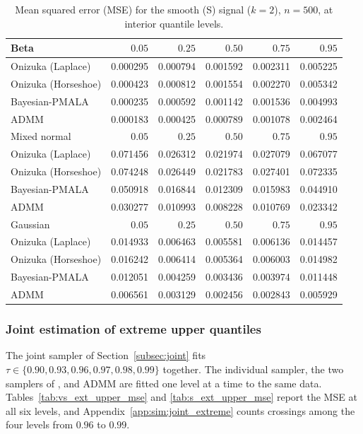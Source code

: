 \begin{table}[!htbp]
\centering
\small
\caption{Mean squared error (MSE) for the smooth (S) signal ($k=2$), $n=500$, at interior quantile levels.}
\label{tab:s_int_mse}
\begin{tabular}{lrrrrr}
\toprule
Beta & $0.05$ & $0.25$ & $0.50$ & $0.75$ & $0.95$ \\
\midrule
Onizuka (Laplace) & 0.000295 & 0.000794 & 0.001592 & 0.002311 & 0.005225 \\
Onizuka (Horseshoe) & 0.000423 & 0.000812 & 0.001554 & 0.002270 & 0.005342 \\
Bayesian-PMALA & 0.000235 & 0.000592 & 0.001142 & 0.001536 & 0.004993 \\
ADMM & 0.000183 & 0.000425 & 0.000789 & 0.001078 & 0.002464 \\
\midrule
Mixed normal & $0.05$ & $0.25$ & $0.50$ & $0.75$ & $0.95$ \\
\midrule
Onizuka (Laplace) & 0.071456 & 0.026312 & 0.021974 & 0.027079 & 0.067077 \\
Onizuka (Horseshoe) & 0.074248 & 0.026449 & 0.021783 & 0.027401 & 0.072335 \\
Bayesian-PMALA & 0.050918 & 0.016844 & 0.012309 & 0.015983 & 0.044910 \\
ADMM & 0.030277 & 0.010993 & 0.008228 & 0.010769 & 0.023342 \\
\midrule
Gaussian & $0.05$ & $0.25$ & $0.50$ & $0.75$ & $0.95$ \\
\midrule
Onizuka (Laplace) & 0.014933 & 0.006463 & 0.005581 & 0.006136 & 0.014457 \\
Onizuka (Horseshoe) & 0.016242 & 0.006414 & 0.005364 & 0.006003 & 0.014982 \\
Bayesian-PMALA & 0.012051 & 0.004259 & 0.003436 & 0.003974 & 0.011448 \\
ADMM & 0.006561 & 0.003129 & 0.002456 & 0.002843 & 0.005929 \\
\bottomrule
\end{tabular}
\end{table}

\subsubsection{Joint estimation of extreme upper quantiles}
\label{sec:sim:extreme}

The joint sampler of Section~\ref{subsec:joint} fits $\tau\in\{0.90,0.93,0.96,0.97,0.98,0.99\}$ together. The individual sampler, the two samplers of \citet{onizuka2024fast}, and ADMM are fitted one level at a time to the same data. Tables~\ref{tab:vs_ext_upper_mse} and \ref{tab:s_ext_upper_mse} report the MSE at all six levels, and Appendix~\ref{app:sim:joint_extreme} counts crossings among the four levels from $0.96$ to $0.99$.

